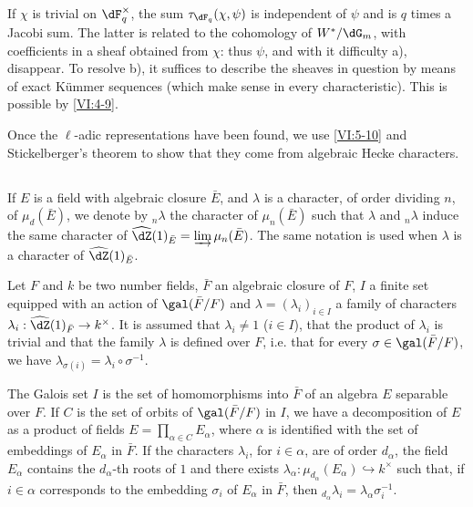 \documentclass[oneside]{book}
\begin{document}
If $\chi$ is trivial on $\dF_q^\times$, the sum $\tau_{\dF_q}(\chi,\psi)$ 
is independent of $\psi$ and is $q$ times a Jacobi sum. The latter is 
related to the cohomology of $W^\ast/\dG_m$, with coefficients in a sheaf 
obtained from $\chi$: thus $\psi$, and with it difficulty a), disappear. To 
resolve b), it suffices to describe the sheaves in question by means of 
exact K\"ummer sequences (which make sense in every characteristic). This is 
possible by \ref{VI:4-9}. 

Once the $\ell$-adic representations have been found, we use 
\ref{VI:5-10} and Stickelberger's theorem to show that they 
come from algebraic Hecke characters. 





\subsection{}\label{VI:6-1}

If $E$ is a field with algebraic closure $\bar E$, and $\lambda$ is 
a character, of order dividing $n$, of $\mu_d(\bar E)$, we denote by $_n\lambda$ the 
character of $\mu_n(\bar E)$ such that $\lambda$ and $_n \lambda$ induce the 
same character of $\widehat\dZ(1)_{\bar E} = \varinjlim \mu_n(\bar E)$. The 
same notation is used when $\lambda$ is a character of $\widehat\dZ(1)_{\bar E}$.

Let $F$ and $k$ be two number fields, $\bar F$ an algebraic closure of 
$F$, $I$ a finite set equipped with an action of $\gal(\bar F/F)$ and 
$\lambda=(\lambda_i)_{i\in I}$ a family of characters 
$\lambda_i:\widehat\dZ(1)_{\bar F} \to k^\times$. It is assumed that 
$\lambda_i\ne 1$ ($i\in I$), that the product of $\lambda_i$ is trivial and that 
the family $\lambda$ is defined over $F$, i.e. that for every 
$\sigma\in \gal(\bar F/F)$, we have 
$\lambda_{\sigma(i)}=\lambda_i\circ \sigma^{-1}$. 

The Galois set $I$ is the set of homomorphisms into $\bar F$ of an 
algebra $E$ separable over $F$. If $C$ is the set of orbits of 
$\gal(\bar F/F)$ in $I$, we have a decomposition of $E$ as a product of fields 
$E=\prod_{\alpha\in C} E_\alpha$, where $\alpha$ is identified with the set of 
embeddings of $E_\alpha$ in $\bar F$. If the characters $\lambda_i$, for 
$i\in \alpha$, are of order $d_\alpha$, the field $E_\alpha$ contains the 
$d_\alpha$-th roots of $1$ and there exists 
$\lambda_\alpha:\mu_{d_\alpha}(E_\alpha) \hookrightarrow k^\times$ such that, if 
$i\in \alpha$ corresponds to the embedding $\sigma_i$ of $E_\alpha$ in $\bar F$, 
then $_{d_\alpha} \lambda_i = \lambda_\alpha \sigma_i^{-1}$. 
\end{document}
